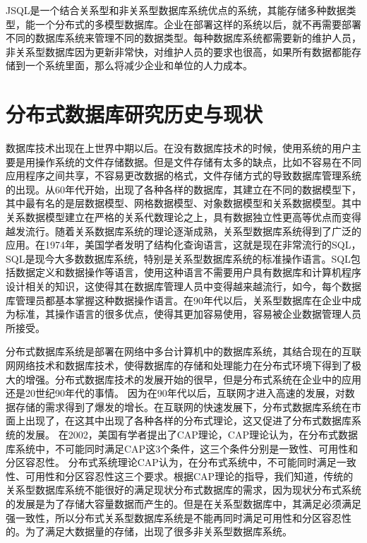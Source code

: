 	JSQL是一个结合关系型和非关系型数据库系统优点的系统，其能存储多种数据类型，能一个分布式的多模型数据库。企业在部署这样的系统以后，就不再需要部署不同的数据库系统来管理不同的数据类型。每种数据库系统都需要新的维护人员，非关系型数据库因为更新非常快，对维护人员的要求也很高，如果所有数据都能存储到一个系统里面，那么将减少企业和单位的人力成本。
\section{分布式数据库研究历史与现状}
数据库技术出现在上世界中期以后。在没有数据库技术的时候，使用系统的用户主要是用操作系统的文件存储数据。但是文件存储有太多的缺点，比如不容易在不同应用程序之间共享，不容易更改数据的格式，文件存储方式的导致数据库管理系统的出现。从60年代开始，出现了各种各样的数据库，其建立在不同的数据模型下，其中最有名的是层数据模型、网格数据模型、对象数据模型和关系数据模型。其中关系数据模型建立在严格的关系代数理论之上，具有数据独立性更高等优点而变得越发流行。随着关系数据库系统的理论逐渐成熟，关系型数据库系统得到了广泛的应用。在1974年，美国学者发明了结构化查询语言，这就是现在非常流行的SQL，SQL是现今大多数数据库系统，特别是关系型数据库系统的标准操作语言。SQL包括数据定义和数据操作等语言，使用这种语言不需要用户具有数据库和计算机程序设计相关的知识，这使得其在数据库管理人员中变得越来越流行，如今，每个数据库管理员都基本掌握这种数据操作语言。在90年代以后，关系型数据库在企业中成为标准，其操作语言的很多优点，使得其更加容易使用，容易被企业数据管理人员所接受。

分布式数据库系统是部署在网络中多台计算机中的数据库系统，其结合现在的互联网网络技术和数据库技术，使得数据库的存储和处理能力在分布式环境下得到了极大的增强。分布式数据库技术的发展开始的很早，但是分布式系统在企业中的应用还是20世纪90年代的事情。
因为在90年代以后，互联网才进入高速的发展，对数据存储的需求得到了爆发的增长。在互联网的快速发展下，分布式数据库系统在市面上出现了，在这其中出现了各种各样的分布式理论，这又促进了分布式数据库系统的发展。 在2002，美国有学者提出了CAP理论，CAP理论认为，在分布式数据库系统中，不可能同时满足CAP这3个条件，这三个条件分别是一致性、可用性和分区容忍性。 分布式系统理论CAP认为，在分布式系统中，不可能同时满足一致性、可用性和分区容忍性这三个要求。根据CAP理论的指导，我们知道，传统的关系型数据库系统不能很好的满足现状分布式数据库的需求，因为现状分布式系统的发展是为了存储大容量数据而产生的。但是在关系型数据库中，其满足必须满足强一致性，所以分布式关系型数据库系统是不能再同时满足可用性和分区容忍性的。为了满足大数据量的存储，出现了很多非关系型数据库系统。


